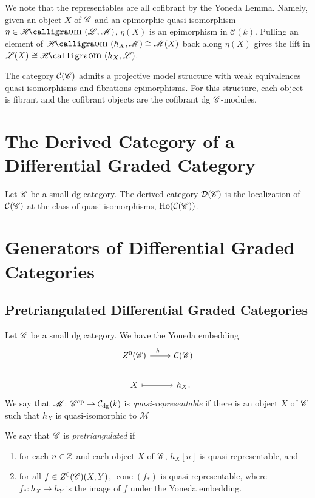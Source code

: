 \documentclass[dissertation.tex]{subfiles}
\begin{document}
\begin{rmk}
  We note that the representables are all cofibrant by the Yoneda Lemma.
  Namely, given an object $X$ of $\mathscr{C}$ and an epimorphic quasi-isomorphism $\eta \in \SHom{\mathscr{L},\mathscr{M}}$, $\eta(X)$ is an epimorphism in $\mathcal{C}(k)$.
  Pulling an element of $\SHom{h_X, \mathscr{M}} \cong \mathscr{M}(X)$ back along $\eta(X)$ gives the lift in $\mathscr{L}(X) \cong \SHom{h_X, \mathscr{L}}$.
\end{rmk}
\begin{thm}
  The category $\mathcal{C}(\mathscr{C})$ admits a projective model structure with weak equivalences quasi-isomorphisms and fibrations epimorphisms.
  For this structure, each object is fibrant and the cofibrant objects are the cofibrant dg $\mathscr{C}$-modules.
\end{thm}

\section{The Derived Category of a Differential Graded Category}

\begin{defn}
  Let $\mathscr{C}$ be a small dg category.
  The derived category $\mathcal{D}(\mathscr{C})$ is the localization of $\mathcal{C}(\mathscr{C})$ at the class of quasi-isomorphisms, $\operatorname{Ho}(\mathcal{C}(\mathscr{C}))$.
\end{defn}

\section{Generators of Differential Graded Categories}
\subsection{Pretriangulated Differential Graded Categories}

\begin{defn}
  Let $\mathscr{C}$ be a small dg category.
  We have the Yoneda embedding 
  $$\begin{tikzcd}
    Z^0(\CC) \arrow{r}{h_{\_}} & \mathcal{C}(\CC)\\
    X \arrow[mapsto]{r} & h_X.
  \end{tikzcd}$$
  We say that $\mathscr{M} \colon \mathscr{C}^\text{op} \rightarrow \mathcal{C}_\text{dg}(k)$ is {\it quasi-representable} if there is an object $X$ of $\mathscr{C}$ such that $h_X$ is quasi-isomorphic to $\mathscr{M}$
  
  We say that $\mathscr{C}$ is {\it pretriangulated} if
  \begin{enumerate}
  \item
    for each $n \in \mathbb{Z}$ and each object $X$ of $\mathscr{C}$, $h_X[n]$ is quasi-representable, and
  \item
    for all $f \in Z^0(\mathscr{C})(X,Y)$, $\operatorname{cone}(f_*)$ is quasi-representable, where $f_* : h_X \rightarrow h_Y$ is the image of $f$ under the Yoneda embedding.
  \end{enumerate}
\end{defn}
\end{document}
